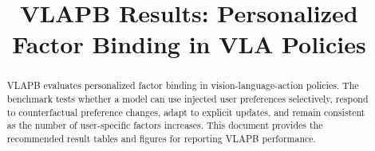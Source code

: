 \documentclass[10pt]{article}
\title{VLAPB Results: Personalized Factor Binding in VLA Policies}
\author{}
\date{}
\begin{document}
\maketitle

\begin{abstract}
VLAPB evaluates personalized factor binding in vision-language-action policies. The benchmark tests whether a model can use injected user preferences selectively, respond to counterfactual preference changes, adapt to explicit updates, and remain consistent as the number of user-specific factors increases. This document provides the recommended result tables and figures for reporting VLAPB performance.
\end{abstract}


\end{document}
